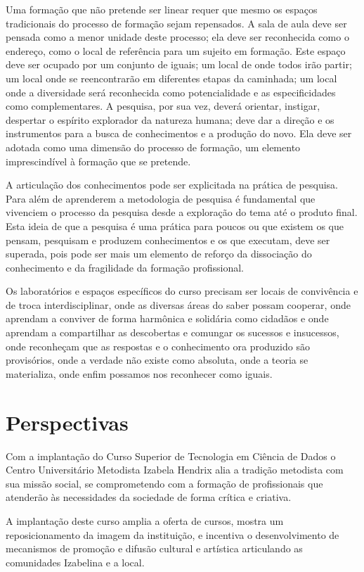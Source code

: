 \documentclass[a4paper, 12pt, openright, oneside, german, french, english, brazil]{abntex2}
\begin{document}
Uma formação que não pretende ser linear requer que mesmo os espaços tradicionais do processo de formação sejam repensados. A sala de aula deve ser pensada como a menor unidade deste processo; ela deve ser reconhecida como o endereço, como o local de referência para um sujeito em formação. Este espaço deve ser ocupado por um conjunto de iguais; um local de onde todos irão partir; um local onde se reencontrarão em diferentes etapas da caminhada; um local onde a diversidade será reconhecida como potencialidade e as especificidades como complementares. A pesquisa, por sua vez, deverá orientar, instigar, despertar o espírito explorador da natureza humana; deve dar a direção e os instrumentos para a busca de conhecimentos e a produção do novo. Ela deve ser adotada como uma dimensão do processo de formação, um elemento imprescindível à formação que se pretende.

A articulação dos conhecimentos pode ser explicitada na prática de pesquisa. Para além de aprenderem a metodologia de pesquisa é fundamental que vivenciem o processo da pesquisa desde a exploração do tema até o produto final. Esta ideia de que a pesquisa é uma prática para poucos ou que existem os que pensam, pesquisam e produzem conhecimentos e os que executam, deve ser superada, pois pode ser mais um elemento de reforço da dissociação do conhecimento e da fragilidade da formação profissional.

Os laboratórios e espaços específicos do curso precisam ser locais de convivência e de troca interdisciplinar, onde as diversas áreas do saber possam cooperar, onde aprendam a conviver de forma harmônica e solidária como cidadãos e onde aprendam a compartilhar as descobertas e comungar os sucessos e insucessos, onde reconheçam que as respostas e o conhecimento ora produzido são provisórios, onde a verdade não existe como absoluta, onde a teoria se materializa, onde enfim possamos nos reconhecer como iguais.

\chapter{Perspectivas}

Com a implantação do Curso Superior de Tecnologia em Ciência de Dados o Centro Universitário Metodista Izabela Hendrix alia a tradição metodista com sua missão social, se comprometendo com a formação de profissionais que atenderão às necessidades da sociedade de forma crítica e criativa.

A implantação deste curso amplia a oferta de cursos, mostra um reposicionamento da imagem da instituição, e incentiva o desenvolvimento de mecanismos de promoção e difusão cultural e artística articulando as comunidades Izabelina e a local.
\end{document}
